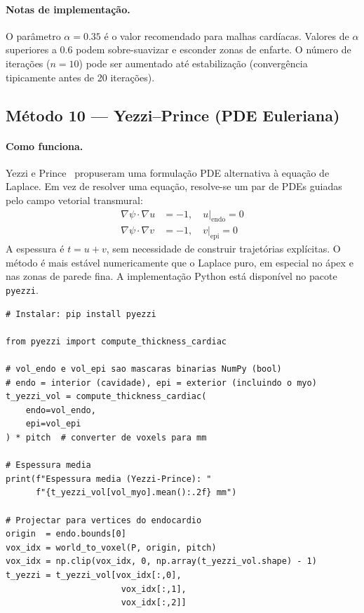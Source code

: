 \paragraph{Notas de implementação.}
O parâmetro $\alpha=0.35$ é o valor recomendado para malhas
cardíacas. Valores de $\alpha$ superiores a 0.6 podem
sobre-suavizar e esconder zonas de enfarte. O número de iterações
($n=10$) pode ser aumentado até estabilização (convergência
tipicamente antes de 20 iterações).

\subsection{Método 10 --- Yezzi--Prince (PDE Euleriana)}
\label{impl:yezzi}

\paragraph{Como funciona.}
Yezzi e Prince~\cite{yezzi2003} propuseram uma formulação PDE
alternativa à equação de Laplace. Em vez de resolver uma equação,
resolve-se um par de PDEs guiadas pelo campo vetorial transmural:
\begin{align}
  \nabla\psi \cdot \nabla u &= -1, \quad u\big|_{\text{endo}} = 0 \\
  \nabla\psi \cdot \nabla v &= -1, \quad v\big|_{\text{epi}} = 0
\end{align}
A espessura é $t = u + v$, sem necessidade de construir
trajetórias explícitas. O método é mais estável numericamente
que o Laplace puro, em especial no ápex e nas zonas de parede
fina. A implementação Python está disponível no pacote
\texttt{pyezzi}.

\begin{lstlisting}
# Instalar: pip install pyezzi

from pyezzi import compute_thickness_cardiac

# vol_endo e vol_epi sao mascaras binarias NumPy (bool)
# endo = interior (cavidade), epi = exterior (incluindo o myo)
t_yezzi_vol = compute_thickness_cardiac(
    endo=vol_endo,
    epi=vol_epi
) * pitch  # converter de voxels para mm

# Espessura media
print(f"Espessura media (Yezzi-Prince): "
      f"{t_yezzi_vol[vol_myo].mean():.2f} mm")

# Projectar para vertices do endocardio
origin  = endo.bounds[0]
vox_idx = world_to_voxel(P, origin, pitch)
vox_idx = np.clip(vox_idx, 0, np.array(t_yezzi_vol.shape) - 1)
t_yezzi = t_yezzi_vol[vox_idx[:,0],
                       vox_idx[:,1],
                       vox_idx[:,2]]
\end{lstlisting}

